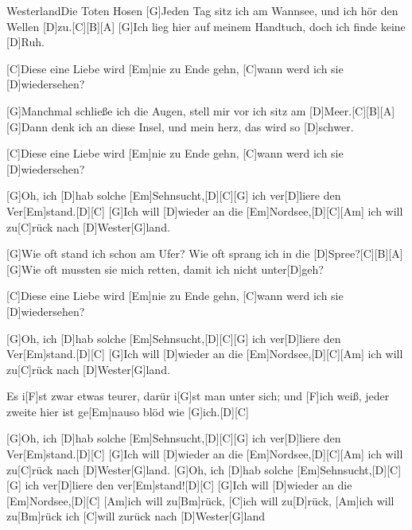 \documentclass[../main.tex]{subfiles}
\begin{document}
\begin{song}{Westerland}{Die Toten Hosen}{}
[G]Jeden Tag sitz ich am Wannsee, und ich hör den Wellen [D]zu.[C]{\hh}[B]{\hh}[A]{\hh}
[G]Ich lieg hier auf meinem Handtuch, doch ich finde keine [D]Ruh.

[C]Diese eine Liebe wird [Em]nie zu Ende gehn, [C]wann werd ich sie [D]wiedersehen?

[G]Manchmal schließe ich die Augen, stell mir vor ich sitz am [D]Meer.[C]{\hh}[B]{\hh}[A]{\hh}
[G]Dann denk ich an diese Insel, und mein herz, das wird so [D]schwer.

[C]Diese eine Liebe wird [Em]nie zu Ende gehn, [C]wann werd ich sie [D]wiedersehen?

[G]Oh, ich [D]hab solche [Em]Sehnsucht,[D]{\hh}[C]{\hh}[G]{\hh} ich ver[D]liere den Ver[Em]stand.[D]{\hh}[C]{\hh}
[G]Ich will [D]wieder an die [Em]Nordsee,[D]{\hh}[C]{\hh}[Am]{\hh} ich will zu[C]rück nach [D]Wester[G]land.

[G]Wie oft stand ich schon am Ufer? Wie oft sprang ich in die [D]Spree?[C]{\hh}[B]{\hh}[A]{\hh}
[G]Wie oft mussten sie mich retten, damit ich nicht unter[D]geh?

[C]Diese eine Liebe wird [Em]nie zu Ende gehn, [C]wann werd ich sie [D]wiedersehen?

[G]Oh, ich [D]hab solche [Em]Sehnsucht,[D]{\hh}[C]{\hh}[G]{\hh} ich ver[D]liere den Ver[Em]stand.[D]{\hh}[C]{\hh}
[G]Ich will [D]wieder an die [Em]Nordsee,[D]{\hh}[C]{\hh}[Am]{\hh} ich will zu[C]rück nach [D]Wester[G]land.

Es i[F]st zwar etwas teurer, darür i[G]st man unter sich;
und [F]ich weiß, jeder zweite hier ist ge[Em]nauso blöd wie [G]ich.[D]{\hh}[C]{\hh}

[G]Oh, ich [D]hab solche [Em]Sehnsucht,[D]{\hh}[C]{\hh}[G]{\hh} ich ver[D]liere den Ver[Em]stand.[D]{\hh}[C]{\hh}
[G]Ich will [D]wieder an die [Em]Nordsee,[D]{\hh}[C]{\hh}[Am]{\hh}  ich will zu[C]rück nach [D]Wester[G]land.
[G]Oh, ich [D]hab solche [Em]Sehnsucht,[D]{\hh}[C]{\hh}[G]{\hh} ich ver[D]liere den ver[Em]stand![D]{\hh}[C]{\hh}
[G]Ich will [D]wieder an die [Em]Nordsee,[D]{\hh}[C]{\hh}
[Am]ich will zu[Bm]rück, [C]ich will zu[D]rück, [Am]ich will zu[Bm]rück
ich [C]will zurück nach [D]Wester[G]land

\end{song}
\end{document}

